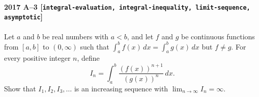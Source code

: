 \paragraph{2017 A--3 \textnormal{[\texttt{integral-evaluation, integral-inequality, limit-sequence, asymptotic}]}}
Let $a$ and $b$ be real numbers with $a<b$, and let $f$ and $g$ be continuous functions from $[a,b]$ to $(0, \infty)$
such that $\int_a^b f(x)\,dx = \int_a^b g(x)\,dx$ but $f \neq g$. For every positive integer $n$, define
\[
I_n = \int_a^b \frac{(f(x))^{n+1}}{(g(x))^n}\,dx.
\]
Show that $I_1, I_2, I_3, \dots$ is an increasing sequence with $\lim_{n \to \infty} I_n = \infty$.
